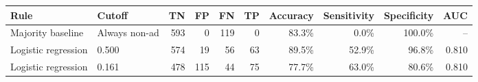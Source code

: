 \begin{tabular}{llrrrrrrrr}
\toprule
Rule & Cutoff & TN & FP & FN & TP & Accuracy & Sensitivity & Specificity & AUC
\\
\midrule
Majority baseline & Always non-ad & 593 & 0 & 119 & 0 & 83.3\% & 0.0\% & 100.0\% & --
\\
Logistic regression & 0.500 & 574 & 19 & 56 & 63 & 89.5\% & 52.9\% & 96.8\% & 0.810
\\
Logistic regression & 0.161 & 478 & 115 & 44 & 75 & 77.7\% & 63.0\% & 80.6\% & 0.810
\\
\bottomrule
\end{tabular}
